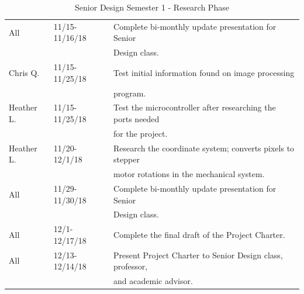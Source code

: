 \begin{table} [H]
\begin{tabular}{|l|l|l|}
		All & 11/15-11/16/18 & Complete bi-monthly update presentation for Senior \\
		& & Design class. \\
		\hline
		Chris Q. & 11/15-11/25/18 & Test initial information found on image processing\\
		& & program. \\
		\hline
		Heather L. & 11/15-11/25/18 & Test the microcontroller after researching the ports needed \\
		& & for the project.\\
		\hline
		Heather L. & 11/20-12/1/18 & Research the coordinate system; converts pixels to stepper \\
		& & motor rotations in the mechanical system.\\
		\hline
		All & 11/29-11/30/18 & 
		Complete bi-monthly update presentation for Senior \\
		& & Design class. \\
		\hline
		All & 12/1-12/17/18 & 
		Complete the final draft of the Project Charter.\\
		\hline
		All & 12/13-12/14/18 & 
		Present Project Charter to Senior Design class, professor, \\
		& & and academic advisor.\\
		\hline
\end{tabular} 
\caption{Senior Design Semester 1 - Research Phase}
\label{table:3}
\end{table}

